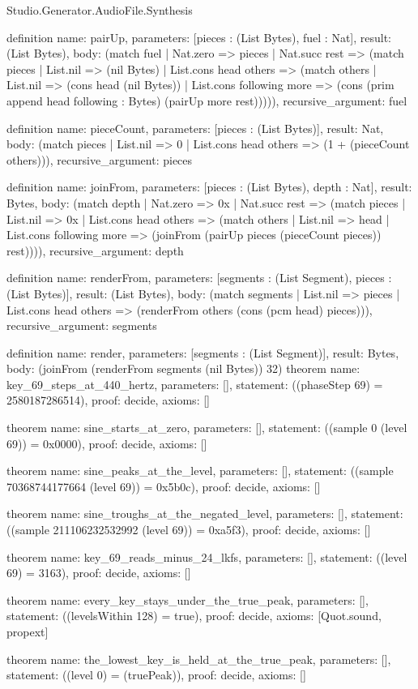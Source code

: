 \begin{lexlean}{Studio.Generator.AudioFile.Synthesis}
\begin{semanticmodule}
definition{
  name: pairUp,
  parameters: [pieces : (List Bytes), fuel : Nat],
  result: (List Bytes),
  body: (match fuel
    | Nat.zero => pieces
    | Nat.succ rest => (match pieces
      | List.nil => (nil Bytes)
      | List.cons head others => (match others
        | List.nil => (cons head (nil Bytes))
        | List.cons following more => (cons (prim append head following : Bytes) (pairUp more rest))))),
  recursive_argument: fuel
}

definition{
  name: pieceCount,
  parameters: [pieces : (List Bytes)],
  result: Nat,
  body: (match pieces
    | List.nil => 0
    | List.cons head others => (1 + (pieceCount others))),
  recursive_argument: pieces
}

definition{
  name: joinFrom,
  parameters: [pieces : (List Bytes), depth : Nat],
  result: Bytes,
  body: (match depth
    | Nat.zero => 0x
    | Nat.succ rest => (match pieces
      | List.nil => 0x
      | List.cons head others => (match others
        | List.nil => head
        | List.cons following more => (joinFrom (pairUp pieces (pieceCount pieces)) rest)))),
  recursive_argument: depth
}

definition{
  name: renderFrom,
  parameters: [segments : (List Segment), pieces : (List Bytes)],
  result: (List Bytes),
  body: (match segments
    | List.nil => pieces
    | List.cons head others => (renderFrom others (cons (pcm head) pieces))),
  recursive_argument: segments
}

definition{
  name: render,
  parameters: [segments : (List Segment)],
  result: Bytes,
  body: (joinFrom (renderFrom segments (nil Bytes)) 32)
}
theorem{
  name: key_69_steps_at_440_hertz,
  parameters: [],
  statement: ((phaseStep 69) = 2580187286514),
  proof: decide{},
  axioms: []
}

theorem{
  name: sine_starts_at_zero,
  parameters: [],
  statement: ((sample 0 (level 69)) = 0x0000),
  proof: decide{},
  axioms: []
}

theorem{
  name: sine_peaks_at_the_level,
  parameters: [],
  statement: ((sample 70368744177664 (level 69)) = 0x5b0c),
  proof: decide{},
  axioms: []
}

theorem{
  name: sine_troughs_at_the_negated_level,
  parameters: [],
  statement: ((sample 211106232532992 (level 69)) = 0xa5f3),
  proof: decide{},
  axioms: []
}

theorem{
  name: key_69_reads_minus_24_lkfs,
  parameters: [],
  statement: ((level 69) = 3163),
  proof: decide{},
  axioms: []
}

theorem{
  name: every_key_stays_under_the_true_peak,
  parameters: [],
  statement: ((levelsWithin 128) = true),
  proof: decide{},
  axioms: [Quot.sound, propext]
}

theorem{
  name: the_lowest_key_is_held_at_the_true_peak,
  parameters: [],
  statement: ((level 0) = (truePeak)),
  proof: decide{},
  axioms: []
}

\end{semanticmodule}
\end{lexlean}
